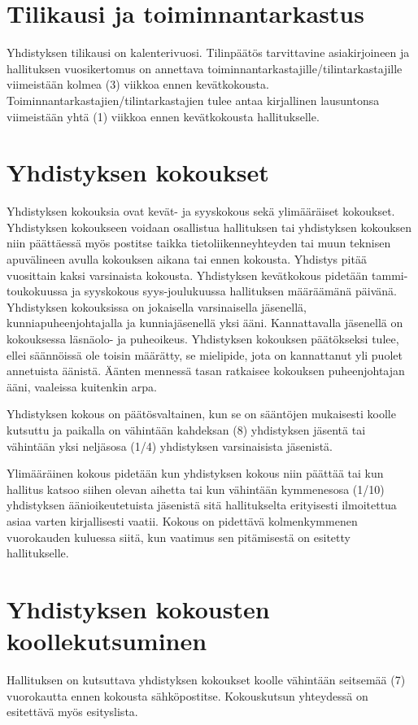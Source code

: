 \documentclass[a4paper, 12pt, finnish]{scrartcl}
\begin{document}
\section{Tilikausi ja toiminnantarkastus}
Yhdistyksen tilikausi on kalenterivuosi.
Tilinpäätös tarvittavine asiakirjoineen ja hallituksen vuosikertomus on annettava toiminnantarkastajille/tilintarkastajille viimeistään kolmea (3) viikkoa ennen kevätkokousta.
Toiminnantarkastajien/tilintarkastajien tulee antaa kirjallinen lausuntonsa viimeistään yhtä (1) viikkoa ennen kevätkokousta hallitukselle.

\section{Yhdistyksen kokoukset}
Yhdistyksen kokouksia ovat kevät- ja syyskokous sekä ylimääräiset kokoukset.
Yhdistyksen kokoukseen voidaan osallistua hallituksen tai yhdistyksen kokouksen niin päättäessä myös postitse taikka tietoliikenneyhteyden tai muun teknisen apuvälineen avulla kokouksen aikana tai ennen kokousta.
Yhdistys pitää vuosittain kaksi varsinaista kokousta.
Yhdistyksen kevätkokous pidetään tammi-toukokuussa ja syyskokous syys-joulukuussa hallituksen määräämänä päivänä.
Yhdistyksen kokouksissa on jokaisella varsinaisella jäsenellä, kunniapuheenjohtajalla ja kunniajäsenellä yksi ääni.
Kannattavalla jäsenellä on kokouksessa läsnäolo- ja puheoikeus.
Yhdistyksen kokouksen päätökseksi tulee, ellei säännöissä ole toisin määrätty, se mielipide, jota on kannattanut yli puolet annetuista äänistä.
Äänten mennessä tasan ratkaisee kokouksen puheenjohtajan ääni, vaaleissa kuitenkin arpa.

Yhdistyksen kokous on päätösvaltainen, kun se on sääntöjen mukaisesti koolle kutsuttu ja paikalla on vähintään kahdeksan (8) yhdistyksen jäsentä tai vähintään yksi neljäsosa (1/4) yhdistyksen varsinaisista jäsenistä.

Ylimääräinen kokous pidetään kun yhdistyksen kokous niin päättää tai kun hallitus katsoo siihen olevan aihetta tai kun vähintään kymmenesosa (1/10) yhdistyksen äänioikeutetuista jäsenistä sitä hallitukselta erityisesti ilmoitettua asiaa varten kirjallisesti vaatii.
Kokous on pidettävä kolmenkymmenen vuorokauden kuluessa siitä, kun vaatimus sen pitämisestä on esitetty hallitukselle.

\section{Yhdistyksen kokousten koollekutsuminen}
Hallituksen on kutsuttava yhdistyksen kokoukset koolle vähintään seitsemää (7) vuorokautta ennen kokousta sähköpostitse.
Kokouskutsun yhteydessä on esitettävä myös esityslista.
\end{document}
